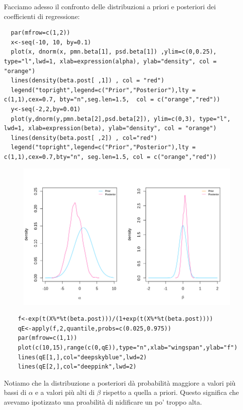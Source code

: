   Facciamo adesso il confronto delle distribuzioni a priori e posteriori dei coefficienti di regressione:
  
  \begin{lstlisting}
  par(mfrow=c(1,2))
  x<-seq(-10, 10, by=0.1)
  plot(x, dnorm(x, pmn.beta[1], psd.beta[1]) ,ylim=c(0,0.25), type="l",lwd=1, xlab=expression(alpha), ylab="density", col = "orange")
  lines(density(beta.post[ ,1]) , col = "red")
  legend("topright",legend=c("Prior","Posterior"),lty = c(1,1),cex=0.7, bty="n",seg.len=1.5,  col = c("orange","red"))
  y<-seq(-2,2,by=0.01)
  plot(y,dnorm(y,pmn.beta[2],psd.beta[2]), ylim=c(0,3), type="l", lwd=1, xlab=expression(beta), ylab="density", col = "orange")
  lines(density(beta.post[ ,2]) , col="red")
  legend("topright",legend=c("Prior","Posterior"),lty = c(1,1),cex=0.7,bty="n", seg.len=1.5, col = c("orange","red"))
  \end{lstlisting}
  \begin{figure}[h!]
    \centering
    \includegraphics[width=0.7\linewidth]{img/esercizio10-2-3}
    \caption{}
    \label{fig:metropolis3}
  \end{figure}
  
  \begin{lstlisting}
    f<-exp(t(X%*%t(beta.post)))/(1+exp(t(X%*%t(beta.post))))
    qE<-apply(f,2,quantile,probs=c(0.025,0.975))
    par(mfrow=c(1,1))
    plot(c(10,15),range(c(0,qE)),type="n",xlab="wingspan",ylab="f")
    lines(qE[1,],col="deepskyblue",lwd=2)
    lines(qE[2,],col="deeppink",lwd=2)
  \end{lstlisting}

  Notiamo che la distribuzione a posteriori dà probabilità maggiore a valori più bassi di $\alpha$ e a valori più alti di $\beta$ rispetto a quella a priori. Questo significa che avevamo ipotizzato una proabilità di nidificare un po' troppo alta.\\
  
